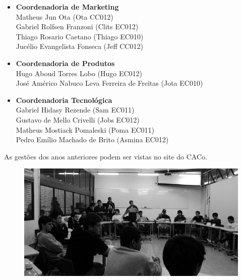 \begin{itemize}
    \item   \textbf{Coordenadoria de Marketing}
        \\Matheus Jun Ota (Ota CC012)
        \\Gabriel Rolfsen Franzoni (Clits EC012)
        \\Thiago Rosario Caetano (Thiago EC010)
        \\Jucélio Evangelista Fonseca (Jeff CC012)

    \item   \textbf{Coordenadoria de Produtos}
        \\Hugo Aboud Torres Lobo (Hugo EC012)
        \\José Américo Nabuco Leva Ferreira de Freitas (Jota EC010)

    \item   \textbf{Coordenadoria Tecnológica}
        \\Gabriel Hidasy Rezende (Sam EC011)
        \\Gustavo de Mello Crivelli (Jobs EC012)
        \\Matheus Mostiack Pomaleski (Poma EC011)
        \\Pedro Emílio Machado de Brito (Asmina EC012)
\end{itemize}

As gestões dos anos anteriores podem ser vistas no site do CACo.

\begin{figure}[H]
    \centering
    \includegraphics[scale=0.29]{img/alem_da_graduacao/caco_pipocaco.jpg}
\end{figure}
